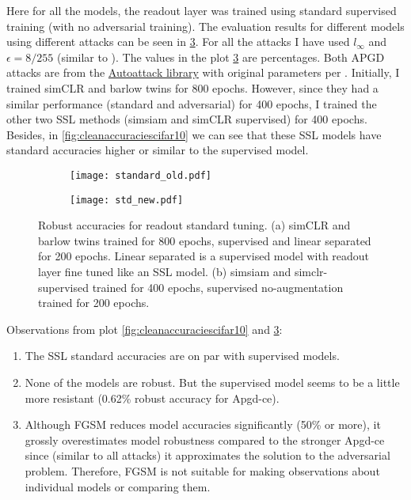 \documentclass[../thesis.tex]{subfiles}
\begin{document}
	Here for all the models, the readout layer was trained using standard supervised training (with no adversarial training). The evaluation results for different models using different attacks can be seen in \ref{fig:standard_readout_results}. For all the attacks I have used $l_{\infty}$ and $\epsilon = 8/255$ (similar to \cite{adv_training_madry}). The values in the plot \ref{fig:standard_readout_results} are percentages. Both APGD attacks are from the \href{https://github.com/fra31/auto-attack}{Autoattack library} with original parameters per \cite{autoattack}. Initially, I trained simCLR and barlow twins for 800 epochs. However, since they had a similar performance (standard and adversarial) for 400 epochs, I trained the other two SSL methods (simsiam and simCLR supervised) for 400 epochs. Besides, in \ref{fig:cleanaccuraciescifar10} we can see that these SSL models have standard accuracies higher or similar to the supervised model.
	
	\begin{figure}[h!]
		\centering
		\begin{subfigure}{.5\textwidth}
			\centering
			\texttt{[image: standard\_old.pdf]}
			\caption{}
			\label{fig:sub1}
		\end{subfigure}%
		\begin{subfigure}{.5\textwidth}
			\centering
			\texttt{[image: std\_new.pdf]}
			\caption{}
			\label{fig:sub2}
		\end{subfigure}
		\caption{Robust accuracies for readout standard tuning. (a) simCLR and barlow twins trained for 800 epochs, supervised and linear separated for 200 epochs. Linear separated is a supervised model with readout layer fine tuned like an SSL model. (b) simsiam and simclr-supervised trained for 400 epochs, supervised no-augmentation trained for 200 epochs.}
		\label{fig:standard_readout_results}
	\end{figure}
	
	
	Observations from plot \ref{fig:cleanaccuraciescifar10} and \ref{fig:standard_readout_results}:
	\begin{enumerate}
		\item The SSL standard accuracies are on par with supervised models.
		
		\item None of the models are robust. But the supervised model seems to be a little more resistant (0.62\% robust accuracy for Apgd-ce).
		
		\item Although FGSM reduces model accuracies significantly (50\% or more), it grossly overestimates model robustness compared to the stronger Apgd-ce since (similar to all attacks) it approximates the solution to the adversarial problem. Therefore, FGSM is not suitable for making observations about individual models or comparing them.   
	\end{enumerate}
	
\end{document}
